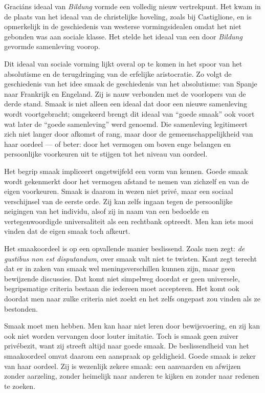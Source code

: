 Graciáns ideaal van \textit{Bildung} vormde een volledig nieuw vertrekpunt. Het kwam in de plaats van het ideaal van de christelijke hoveling, zoals bij Castiglione, en is opmerkelijk in de geschiedenis van westerse vormingsidealen omdat het niet gebonden was aan sociale klasse. Het stelde het ideaal van een door \textit{Bildung} gevormde samenleving voorop.

Dit ideaal van sociale vorming lijkt overal op te komen in het spoor van het absolutisme en de terugdringing van de erfelijke aristocratie. Zo volgt de geschiedenis van het idee smaak de geschiedenis van het absolutisme: van Spanje naar Frankrijk en Engeland. Zij is nauw verbonden met de voorlopers van de derde stand. Smaak is niet alleen een ideaal dat door een nieuwe samenleving wordt voortgebracht; omgekeerd brengt dit ideaal van ``goede smaak'' ook voort wat later de ``goede samenleving'' werd genoemd. Die samenleving legitimeert zich niet langer door afkomst of rang, maar door de gemeenschappelijkheid van haar oordeel — of beter: door het vermogen om boven enge belangen en persoonlijke voorkeuren uit te stijgen tot het niveau van oordeel.

Het begrip smaak impliceert ongetwijfeld een vorm van kennen. Goede smaak wordt gekenmerkt door het vermogen afstand te nemen van zichzelf en van de eigen voorkeuren. Smaak is daarom in wezen niet privé, maar een sociaal verschijnsel van de eerste orde. Zij kan zelfs ingaan tegen de persoonlijke neigingen van het individu, alsof zij in naam van een bedoelde en vertegenwoordigde universaliteit als een rechtbank optreedt. Men kan iets mooi vinden dat de eigen smaak toch afkeurt.

Het smaakoordeel is op een opvallende manier beslissend. Zoals men zegt: \textit{de gustibus non est disputandum}, over smaak valt niet te twisten. Kant zegt terecht dat er in zaken van smaak wel meningsverschillen kunnen zijn, maar geen bewijzende discussies. Dat komt niet simpelweg doordat er geen universele, begripsmatige criteria bestaan die iedereen moet accepteren. Het komt ook doordat men naar zulke criteria niet zoekt en het zelfs ongepast zou vinden als ze bestonden.

Smaak moet men hebben. Men kan haar niet leren door bewijsvoering, en zij kan ook niet worden vervangen door louter imitatie. Toch is smaak geen zuiver privébezit, want zij streeft altijd naar goede smaak. De beslissendheid van het smaakoordeel omvat daarom een aanspraak op geldigheid. Goede smaak is zeker van haar oordeel. Zij is wezenlijk zekere smaak: een aanvaarden en afwijzen zonder aarzeling, zonder heimelijk naar anderen te kijken en zonder naar redenen te zoeken.

